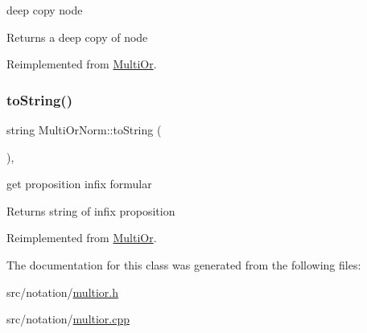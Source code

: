 deep copy node 

\begin{DoxyReturn}{Returns}
a deep copy of node 
\end{DoxyReturn}


Reimplemented from \hyperlink{class_multi_or_a9a81647d40f86c825fdb1513f1b3f30c}{Multi\+Or}.

\mbox{\label{class_multi_or_norm_ad70e2ca31478183da21ee1995964c2c3}} 
\subsubsection{\texorpdfstring{to\+String()}{toString()}}
{\footnotesize\ttfamily string Multi\+Or\+Norm\+::to\+String (\begin{DoxyParamCaption}{ }\end{DoxyParamCaption})\hspace{0.3cm}{\ttfamily [override]}, {\ttfamily [virtual]}}



get proposition infix formular 

\begin{DoxyReturn}{Returns}
string of infix proposition 
\end{DoxyReturn}


Reimplemented from \hyperlink{class_multi_or_ade4d5f7db13aca1020dba2396ef00dd7}{Multi\+Or}.



The documentation for this class was generated from the following files\+:\begin{DoxyCompactItemize}
\item 
src/notation/\hyperlink{multior_8h}{multior.\+h}\item 
src/notation/\hyperlink{multior_8cpp}{multior.\+cpp}\end{DoxyCompactItemize}
